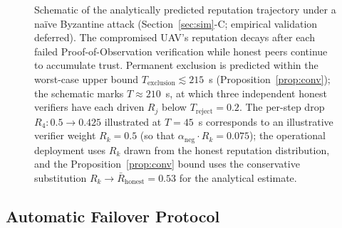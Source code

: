 \documentclass[conference,10pt]{IEEEtran}
\begin{document}
\begin{figure}[t]
\centering
{}
\caption{Schematic of the analytically predicted reputation trajectory under a na\"ive Byzantine attack (Section~\ref{sec:sim}-C; empirical validation deferred). The compromised UAV's reputation decays after each failed Proof-of-Observation verification while honest peers continue to accumulate trust. Permanent exclusion is predicted within the worst-case upper bound $T_\text{exclusion}\lesssim 215$~s (Proposition~\ref{prop:conv}); the schematic marks $T\!\approx\!210$~s, at which three independent honest verifiers have each driven $R_j$ below $T_\text{reject}=0.2$. The per-step drop $R_4: 0.5\to 0.425$ illustrated at $T{=}45$~s corresponds to an illustrative verifier weight $R_k=0.5$ (so that $\alpha_\text{neg}\cdot R_k = 0.075$); the operational deployment uses $R_k$ drawn from the honest reputation distribution, and the Proposition~\ref{prop:conv} bound uses the conservative substitution $R_k\to\bar{R}_\text{honest}=0.53$ for the analytical estimate.}
\label{fig:repu}
\end{figure}

\subsection{Automatic Failover Protocol}
\end{document}
